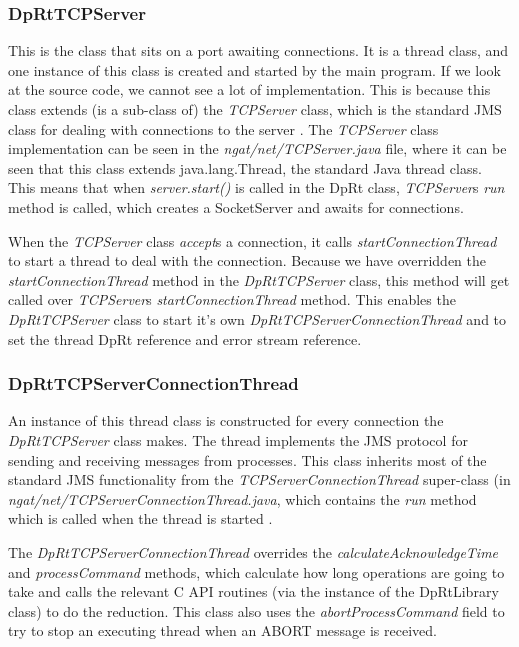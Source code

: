 \documentclass[10pt,a4paper]{article}
\begin{document}
\subsubsection{DpRtTCPServer}
This is the class that sits on a port awaiting connections. It is a thread class, and one instance of this
class is created and started by the main program. If we look at the source code, we cannot see a lot
of implementation. This is because this class extends (is a sub-class of) the {\em TCPServer} class, which is
the standard JMS class for dealing with connections to the server \cite{bib:jmsnnp}. 
The {\em TCPServer} class implementation
can be seen in the {\em ngat/net/TCPServer.java} file, where it can be seen that this class extends
java.lang.Thread, the standard Java thread class. This means that when {\em server.start()} is called in
the DpRt class, {\em TCPServer}s {\em run} method is called, which creates a SocketServer and awaits for
connections. 

When the {\em TCPServer} class {\em accept}s a connection, it calls {\em startConnectionThread} to start
a thread to deal with the connection. Because we have overridden the {\em startConnectionThread} method in
the {\em DpRtTCPServer} class, this method will get called over {\em TCPServer}s {\em startConnectionThread} method.
This enables the {\em DpRtTCPServer} class to start it's own {\em DpRtTCPServerConnectionThread} and to set
the thread DpRt reference and error stream reference.

\subsubsection{DpRtTCPServerConnectionThread}
An instance of this thread class is constructed for every connection the {\em DpRtTCPServer} class makes.
The thread implements the JMS protocol for sending and receiving messages from processes. This class 
inherits most of the standard JMS functionality from the {\em TCPServerConnectionThread} super-class
(in {\em ngat/net/TCPServerConnectionThread.java}, which
contains the {\em run} method which is called when the thread is started \cite{bib:jmsnnp}.

The {\em DpRtTCPServerConnectionThread}
overrides the {\em calculateAcknowledgeTime} and {\em processCommand} methods, which calculate how
long operations are going to take and calls the relevant C API routines (via the instance of the 
DpRtLibrary class) to do the reduction. This class also uses the {\em abortProcessCommand} field to try
to stop an executing thread when an ABORT message is received.
\end{document}
